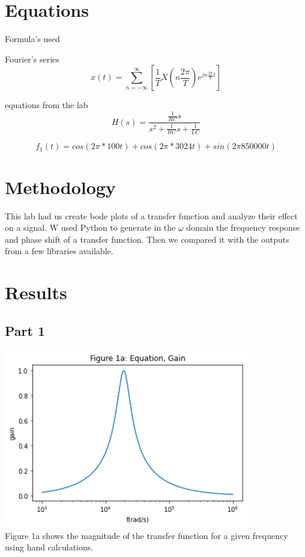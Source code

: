 \documentclass[12pt,a4paper]{article}
\begin{document}
\section{Equations}\label{sec:lit-rev}
Formula's used

Fourier's series
\[x(t) = \sum_{n=-\infty}^\infty \left[ \frac {1}{T} X\left(n \frac{2\pi}{T}\right) e^{j n \frac{2\pi}{T} t}\right]\]


equations from the lab
\[H(s) = \frac{\frac{1}{RC}s}{s^2+\frac{1}{RC}s+\frac{1}{LC}}\]

\[f_1(t) = cos(2\pi*100t) + cos(2\pi*3024t)+sin(2\pi850000t)\]



\section{Methodology}\label{sec:meth}
This lab had us create bode plots of a transfer function and analyze their effect on a signal. W used Python to generate in the $\omega$ domain the frequency response and phase shift of a transfer function. Then we compared it with the outputs from a few libraries available.

\section{Results}\label{sec:res}
\subsection*{Part 1}


\includegraphics[width=0.8\textwidth]{Figure 1a.png}\\
Figure 1a shows the magnitude of the transfer function for a given frequency using hand calculations. \\
\end{document}

